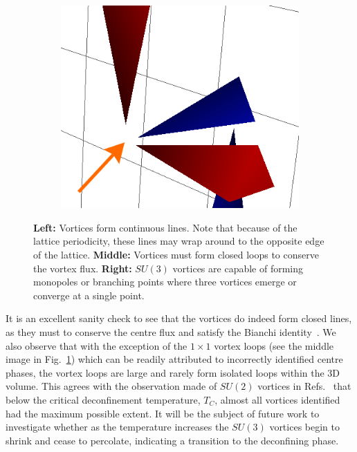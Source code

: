 \begin{figure}[htb!]
\begin{subfigure}[b]{0.3\textwidth}
    \end{subfigure}\hfill
    \begin{subfigure}[b]{0.3\textwidth}
	\includegraphics[width=\textwidth]{./plaqt1_monopole.png}
    \end{subfigure}
    \caption{\label{fig:VortexFeatures} \textbf{Left:} Vortices form continuous lines. Note that because of the lattice periodicity, these lines may wrap around to the opposite edge of the lattice. \textbf{Middle:} Vortices must form closed loops to conserve the vortex flux. \textbf{Right:} $SU(3)$ vortices are capable of forming monopoles or branching points where three vortices emerge or converge at a single point.}
\end{figure}
%
It is an excellent sanity check to see that the vortices do indeed form closed lines, as they must to conserve the centre flux and satisfy the Bianchi identity~\cite{Engelhardt:2003wm,Spengler:2018dxt}. We also observe that with the exception of the $1\times 1$ vortex loops (see the middle image in Fig.~\ref{fig:VortexFeatures}) which can be readily attributed to incorrectly identified centre phases, the vortex loops are large and rarely form isolated loops within the 3D volume. This agrees with the observation made of $SU(2)$ vortices in Refs.~\cite{Engelhardt:1999fd,Bertle:1999tw} that below the critical deconfinement temperature, $T_C$, almost all vortices identified had the maximum possible extent. It will be the subject of future work to investigate whether as the temperature increases the $SU(3)$ vortices begin to shrink and cease to percolate, indicating a transition to the deconfining phase.\\

